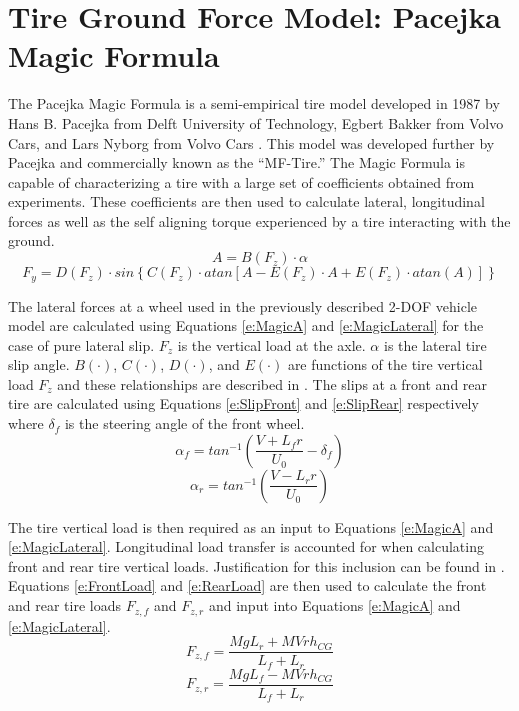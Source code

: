 \documentclass[12pt,onecolumn]{report}
\begin{document}
\section{Tire Ground Force Model: Pacejka Magic Formula}\label{s:Pacejka}

The Pacejka Magic Formula is a semi-empirical tire model developed in 1987 by Hans B. Pacejka from Delft University of Technology, Egbert Bakker from Volvo Cars, and Lars Nyborg from Volvo Cars \cite{TireSensitivityStudy}. This model was developed further by Pacejka and commercially known as the ``MF-Tire.'' The Magic Formula is capable of characterizing a tire with a large set of coefficients obtained from experiments. These coefficients are then used to calculate lateral, longitudinal forces as well as the self aligning torque experienced by a tire interacting with the ground. 
%
\begin{equation}\label{e:MagicA}
A = B\left(F_z\right)\cdot\alpha 
\end{equation}
\begin{equation}\label{e:MagicLateral}
F_y = D\left(F_z\right)\cdot sin\left\{C\left(F_z\right)\cdot atan\left[A-E\left(F_z\right)\cdot A+E\left(F_z\right)\cdot atan\left(A\right)\right]\right\}
\end{equation}

The lateral forces at a wheel used in the previously described 2-DOF vehicle model are calculated using Equations \eqref{e:MagicA} and \eqref{e:MagicLateral} for the case of pure lateral slip.  $F_{z}$ is the vertical load at the axle. $\alpha$ is the lateral tire slip angle. $B\left(\cdot\right)$, $C\left(\cdot\right)$, $D\left(\cdot\right)$, and $E\left(\cdot\right)$ are functions of the tire vertical load $F_{z}$ and these relationships are described in \cite{Pacejka2012}. The slips at a front and rear tire are calculated using Equations \eqref{e:SlipFront} and \eqref{e:SlipRear} respectively where $\delta_f$ is the steering angle of the front wheel.
%
\begin{equation}\label{e:SlipFront}
\alpha_f = tan^{-1}\left( \frac{V+L_{f}r}{U_0} - \delta_f\right) 
\end{equation}
\begin{equation}\label{e:SlipRear}
\alpha_r = tan^{-1}\left( \frac{V-L_{r}r}{U_0}\right)
\end{equation}

The tire vertical load is then required as an input to Equations \eqref{e:MagicA} and \eqref{e:MagicLateral}. Longitudinal load transfer is accounted for when calculating front and rear tire vertical loads. Justification for this inclusion can be found in \cite{ModelFidelity2016}. Equations \eqref{e:FrontLoad} and \eqref{e:RearLoad} are then used to calculate the front and rear tire loads $F_{z,f}$ and $F_{z,r}$ and input into Equations \eqref{e:MagicA} and \eqref{e:MagicLateral}.
%
\begin{equation}\label{e:FrontLoad}
F_{z,f}= \frac{MgL_r + MVrh_{CG}}{L_f+L_r} 
\end{equation}
\begin{equation}\label{e:RearLoad}
F_{z,r}= \frac{MgL_f - MVrh_{CG}}{L_f+L_r} 
\end{equation}
\end{document}
